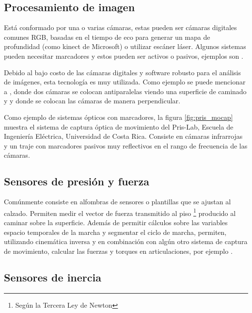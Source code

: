 \subsection{Procesamiento de imagen}

Está conformado por una o varias cámaras, estas pueden ser cámaras digitales comunes RGB, basadas en el tiempo de eco para generar un mapa de profundidad (como kinect de Microsoft) o utilizar escáner láser. Algunos sistemas pueden necesitar marcadores y estos pueden ser activos o pasivos, ejemplos son \cite{prakash, yang2}. \citep{muro}

Debido al bajo costo de las cámaras digitales y software robusto para el análisis de imágenes, esta tecnología es muy utilizada. Como ejemplo se puede mencionar a \cite{hoang}, donde dos cámaras se colocan antiparalelas viendo una superficie de caminado y \cite{li} y \cite{mrozowski} donde se colocan las cámaras de manera perpendicular. 

Como ejemplo de sistemas ópticos con marcadores, la figura \ref{fig:pris_mocap} muestra el sistema de captura óptica de movimiento  del Pris-Lab, Escuela de Ingeniería Eléctrica, Universidad de Costa Rica. Consiste en cámaras infrarrojas y un traje con marcadores pasivos muy reflectivos en el rango de frecuencia de las cámaras. 


\subsection{Sensores de presión y fuerza}

Comúnmente consiste en alfombras de sensores o plantillas que se ajustan al calzado. Permiten medir el vector de fuerza transmitido al piso \footnote{Según la Tercera Ley de Newton} producido al caminar sobre la superficie. Además de permitir cálculos sobre las variables espacio temporales de la marcha y segmentar el ciclo de marcha, permiten, utilizando cinemática inversa y en combinación con algún otro sistema de captura de movimiento, calcular las fuerzas y torques en articulaciones, por ejemplo \cite{mizoguchi}.

\subsection{Sensores de inercia}

